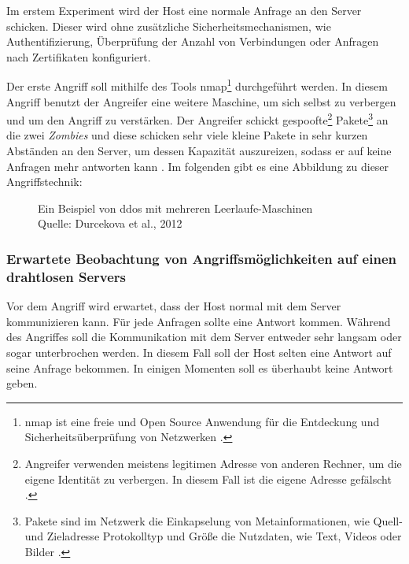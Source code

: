 Im erstem Experiment wird der Host eine normale Anfrage an den Server schicken. Dieser wird ohne zusätzliche 
Sicherheitsmechanismen, wie Authentifizierung, Überprüfung der Anzahl von Verbindungen oder Anfragen nach Zertifikaten 
konfiguriert.

Der erste Angriff soll mithilfe des Tools \acrfull{nmap}\footnote{\acrshort{nmap} ist eine freie und Open Source Anwendung
für die Entdeckung und Sicherheitsüberprüfung von Netzwerken \cite{refst:nmap}.} durchgeführt werden. In diesem Angriff 
benutzt der Angreifer eine weitere Maschine, um sich selbst zu verbergen und um den Angriff zu verstärken. Der Angreifer
schickt gespoofte\footnote{Angreifer verwenden meistens legitimen Adresse von anderen Rechner, um die eigene Identität
zu verbergen. In diesem Fall ist die eigene Adresse gefälscht \cite{refst:IPIO}.} Pakete\footnote{Pakete sind im Netzwerk
die Einkapselung von Metainformationen, wie Quell-und Zieladresse Protokolltyp und Größe die Nutzdaten, wie Text, 
Videos oder Bilder \cite{refbook:SWIS}.} an die zwei \textit{Zombies} und diese schicken sehr viele kleine Pakete in sehr
kurzen Abständen an den Server, um dessen Kapazität auszureizen, sodass er auf keine Anfragen mehr antworten kann 
\cite{refip:KSDD}. Im folgenden gibt es eine Abbildung zu dieser Angriffstechnik:

\begin{figure}[H]
  \caption{Ein Beispiel von \acrfull{ddos} mit mehreren Leerlaufe-Maschinen
  \\ Quelle: Durcekova et al., 2012}
  \label{fig:VDSD}
\end{figure}

\subsubsection{Erwartete Beobachtung von Angriffsmöglichkeiten auf einen drahtlosen Servers}
Vor dem Angriff wird erwartet, dass der Host normal mit dem Server kommunizieren kann. Für jede Anfragen sollte eine
Antwort kommen. Während des Angriffes soll die Kommunikation mit dem Server entweder sehr langsam oder sogar unterbrochen 
werden. In diesem Fall soll der Host selten eine Antwort auf seine Anfrage bekommen. In einigen Momenten soll es überhaubt 
keine Antwort geben. 

